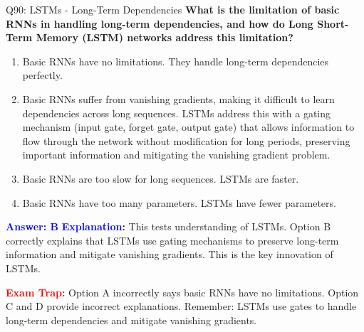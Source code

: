 \documentclass[8pt]{beamer}
\begin{document}
	\begin{frame}{Q90: LSTMs - Long-Term Dependencies}
		\fontsize{6.5}{7.5}\selectfont
		\textbf{What is the limitation of basic RNNs in handling long-term dependencies, and how do Long Short-Term Memory (LSTM) networks address this limitation?}
		
		\begin{enumerate}
			\item Basic RNNs have no limitations. They handle long-term dependencies perfectly.
			\item Basic RNNs suffer from vanishing gradients, making it difficult to learn dependencies across long sequences. LSTMs address this with a gating mechanism (input gate, forget gate, output gate) that allows information to flow through the network without modification for long periods, preserving important information and mitigating the vanishing gradient problem.
			\item Basic RNNs are too slow for long sequences. LSTMs are faster.
			\item Basic RNNs have too many parameters. LSTMs have fewer parameters.
		\end{enumerate}
		
		\vspace{0.1cm}
		\textcolor{blue}{\textbf{Answer: B}}
		\vspace{0.1cm}
		\textcolor{blue}{\textbf{Explanation:}} This tests understanding of LSTMs. Option B correctly explains that LSTMs use gating mechanisms to preserve long-term information and mitigate vanishing gradients. This is the key innovation of LSTMs.
		
		\textcolor{red}{\textbf{Exam Trap:}} Option A incorrectly says basic RNNs have no limitations. Option C and D provide incorrect explanations. Remember: LSTMs use gates to handle long-term dependencies and mitigate vanishing gradients.
	\end{frame}
	
	
\end{document}
